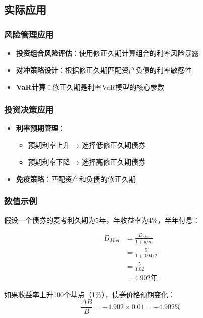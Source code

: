 \subsection{实际应用}

\subsubsection{风险管理应用}
\begin{itemize}
    \item \textbf{投资组合风险评估}：使用修正久期计算组合的利率风险暴露
    \item \textbf{对冲策略设计}：根据修正久期匹配资产负债的利率敏感性
    \item \textbf{VaR计算}：修正久期是利率VaR模型的核心参数
\end{itemize}

\subsubsection{投资决策应用}
\begin{itemize}
    \item \textbf{利率预期管理}：
    \begin{itemize}
        \item 预期利率上升 → 选择低修正久期债券
        \item 预期利率下降 → 选择高修正久期债券
    \end{itemize}
    \item \textbf{免疫策略}：匹配资产和负债的修正久期
\end{itemize}

\subsubsection{数值示例}

假设一个债券的麦考利久期为5年，年收益率为4\%，半年付息：

\begin{align}
D_{Mod} &= \frac{D_{Mac}}{1 + y/m} \\
&= \frac{5}{1 + 0.04/2} \\
&= \frac{5}{1.02} \\
&= 4.902 \text{年}
\end{align}

如果收益率上升100个基点（1\%），债券价格预期变化：
\begin{equation}
\frac{\Delta B}{B} = -4.902 \times 0.01 = -4.902\%
\end{equation}


